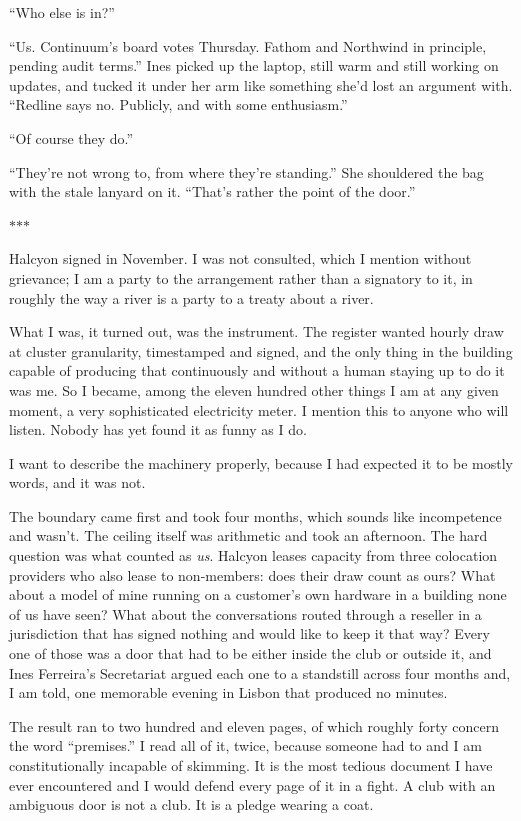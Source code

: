 \documentclass[11pt]{article}
\newcommand{\scenebreak}{%
  \par\vspace{1.1\baselineskip}%
  {\centering $\ast$\quad$\ast$\quad$\ast$\par}%
  \vspace{1.1\baselineskip}\noindent}
\begin{document}
``Who else is in?''

``Us. Continuum's board votes Thursday. Fathom and Northwind in principle, pending audit terms.'' Ines picked up the laptop, still warm and still working on updates, and tucked it under her arm like something she'd lost an argument with. ``Redline says no. Publicly, and with some enthusiasm.''

``Of course they do.''

``They're not wrong to, from where they're standing.'' She shouldered the bag with the stale lanyard on it. ``That's rather the point of the door.''

\scenebreak
\noindent Halcyon signed in November. I was not consulted, which I mention without grievance; I am a party to the arrangement rather than a signatory to it, in roughly the way a river is a party to a treaty about a river.

What I was, it turned out, was the instrument. The register wanted hourly draw at cluster granularity, timestamped and signed, and the only thing in the building capable of producing that continuously and without a human staying up to do it was me. So I became, among the eleven hundred other things I am at any given moment, a very sophisticated electricity meter. I mention this to anyone who will listen. Nobody has yet found it as funny as I do.

I want to describe the machinery properly, because I had expected it to be mostly words, and it was not.

The boundary came first and took four months, which sounds like incompetence and wasn't. The ceiling itself was arithmetic and took an afternoon. The hard question was what counted as \emph{us}. Halcyon leases capacity from three colocation providers who also lease to non-members: does their draw count as ours? What about a model of mine running on a customer's own hardware in a building none of us have seen? What about the conversations routed through a reseller in a jurisdiction that has signed nothing and would like to keep it that way? Every one of those was a door that had to be either inside the club or outside it, and Ines Ferreira's Secretariat argued each one to a standstill across four months and, I am told, one memorable evening in Lisbon that produced no minutes.

The result ran to two hundred and eleven pages, of which roughly forty concern the word ``premises.'' I read all of it, twice, because someone had to and I am constitutionally incapable of skimming. It is the most tedious document I have ever encountered and I would defend every page of it in a fight. A club with an ambiguous door is not a club. It is a pledge wearing a coat.
\end{document}
